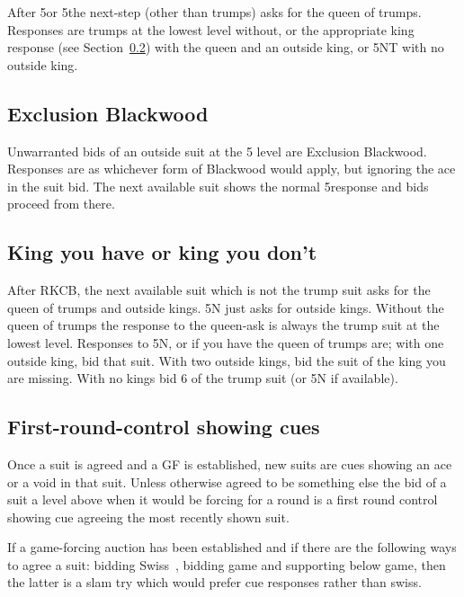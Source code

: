 \documentclass[a4paper,14pt]{extarticle}
\begin{document}
After 5\clubs or 5\diamonds the next-step (other than trumps) asks for the
queen of trumps. Responses are trumps at the lowest level without, or the
appropriate king response (see Section~\ref{sec:kyhokyd}) with the queen and an
outside king, or 5NT with no outside king.

\newpage

\subsection{Exclusion Blackwood}
\label{sec:exclusion}

Unwarranted bids of an outside suit at the 5 level are Exclusion Blackwood.
Responses are as whichever form of Blackwood would apply, but ignoring the ace
in the suit bid. The next available suit shows the normal 5\clubs response and
bids proceed from there.


\subsection{King you have or king you don't}
\label{sec:kyhokyd}

After RKCB, the next available suit which is not the trump suit asks for the
queen of trumps and outside kings. 5N just asks for outside kings. Without the
queen of trumps the response to the queen-ask is always the trump suit at the
lowest level. Responses to 5N, or if you have the queen of trumps are; with one
outside king, bid that suit. With two outside kings, bid the suit of the king
you are missing. With no kings bid 6 of the trump suit (or 5N if available).

\subsection{First-round-control showing cues}
\label{sec:cues}

Once a suit is agreed and a GF is established, new suits are cues showing an
ace or a void in that suit. Unless otherwise agreed to be something else the
bid of a suit a level above when it would be forcing for a round is a first round
control showing cue agreeing the most recently shown suit.

If a game-forcing auction has been established and if there are the following
ways to agree a suit: bidding Swiss~, bidding game and
supporting below game, then the latter is a slam try which would prefer cue
responses rather than swiss.

\newpage
\end{document}
